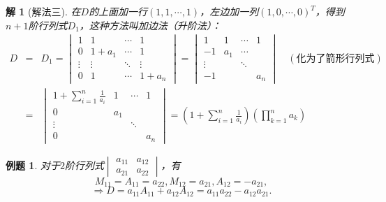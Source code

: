 \documentclass[a4paper]{book}
\newtheorem{eg}{例题}[chapter]
\newtheorem*{solution}{解}
\begin{document}
\begin{solution}[解法三]
在$D$的上面加一行$(1,1,\cdots,1)$，左边加一列$(1,0,\cdots,0)^T$，得到$n+1$阶行列式$D_1$，这种方法叫加边法（升阶法）：
\begin{eqnarray*}
D & = & D_1 = \begin{vmatrix}
1 & 1 & \cdots & 1 \\ 0 & 1+a_1 & \cdots & 1 \\ \vdots & \vdots & \ddots & \vdots \\ 0 & 1 & \cdots & 1+a_n \end{vmatrix} = \begin{vmatrix}
1 & 1 & \cdots & 1 \\ -1 & a_1 & \cdots & \\ \vdots & & \ddots & \\ -1 & & & a_n \end{vmatrix} \quad (\text{化为了箭形行列式}) \\
& = & \begin{vmatrix} 1+\sum\limits_{i=1}^n\frac{1}{a_i} & 1 & \cdots & 1 \\ 0 & a_1 & & \\ \vdots & & \ddots & \\ 0 & & & a_n \end{vmatrix} = (1+\sum\limits_{i=1}^n\frac{1}{a_i})(\prod\limits_{k=1}^n a_k)
\end{eqnarray*}
\end{solution}

\begin{eg}
对于$2$阶行列式$\begin{vmatrix} a_{11} & a_{12} \\ a_{21} & a_{22} \end{vmatrix}$，有
$$M_{11} = A_{11} = a_{22}, M_{12} = a_{21}, A_{12} = -a_{21},$$
$$\Rightarrow D = a_{11}A_{11} + a_{12}A_{12} = a_{11}a_{22} - a_{12}a_{21}.$$
\end{eg}
\end{document}
